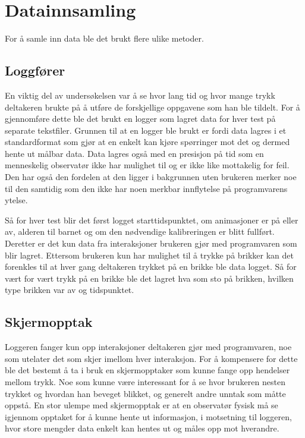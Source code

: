  
\section{Datainnsamling} 
 
 
For å samle inn data ble det brukt flere ulike metoder.  
 
 
\subsection{Loggfører} 
En viktig del av undersøkelsen var å se hvor lang tid og hvor mange trykk deltakeren brukte på å utføre de forskjellige oppgavene som han ble tildelt. For å gjennomføre dette ble det brukt en logger som lagret data for hver test på separate tekstfiler. Grunnen til at en logger ble brukt er fordi data lagres i et standardformat som gjør at en enkelt kan kjøre spørringer mot det og dermed hente ut målbar data. Data lagres også med en presisjon på tid som en menneskelig observatør ikke har mulighet til og er ikke like mottakelig for feil. Den har også den fordelen at den ligger i bakgrunnen uten brukeren merker noe til den samtidig som den ikke har noen merkbar innflytelse på programvarens ytelse. 
 
 
Så for hver test blir det først logget starttidspunktet, om animasjoner er på eller av, alderen til barnet og om den nødvendige kalibreringen er blitt fullført. Deretter er det kun data fra interaksjoner brukeren gjør med programvaren som blir lagret. Ettersom brukeren kun har mulighet til å trykke på brikker kan det forenkles til at hver gang deltakeren trykket på en brikke ble data logget. Så for vært for vært trykk på en brikke ble det lagret hva som sto på brikken, hvilken type brikken var av og tidspunktet. 
 
 
 
 
\subsection{Skjermopptak} 
 
 
Loggeren fanger kun opp interaksjoner deltakeren gjør med programvaren, noe som utelater det som skjer imellom hver interaksjon. For å kompensere for dette ble det bestemt å ta i bruk en skjermopptaker som kunne fange opp hendelser mellom trykk. Noe som kunne være interessant for å se hvor brukeren nesten trykket og hvordan han beveget blikket, og generelt andre unntak som måtte oppstå. En stor ulempe med skjermopptak er at en observatør fysisk må se igjennom opptaket for å kunne hente ut informasjon, i motsetning til loggeren, hvor store mengder data enkelt kan hentes ut og måles opp mot hverandre. 
 

